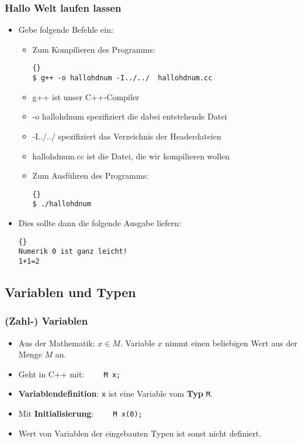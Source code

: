 \begin{frame}[fragile]
\frametitle{Hallo Welt laufen lassen}
\begin{itemize}
\item Gebe folgende Befehle ein:
\begin{itemize}
\item Zum Kompilieren des Programms:
{\footnotesize\begin{lstlisting}{}
$ g++ -o hallohdnum -I../../  hallohdnum.cc
\end{lstlisting}}
\item g++ ist unser C++-Compiler
\item -o hallohdnum spezifiziert die dabei entstehende Datei
\item -I../../ spezifiziert das Verzeichnis der Headerdateien
\item hallohdnum.cc ist die Datei, die wir kompilieren wollen
\item Zum Ausführen des Programms:
{\small\begin{lstlisting}{}
$ ./hallohdnum
\end{lstlisting}}
\end{itemize}
\item Dies sollte dann die folgende Ausgabe liefern:
{\small\begin{lstlisting}{}
Numerik 0 ist ganz leicht!
1+1=2
\end{lstlisting}}
\end{itemize}
\end{frame}


\subsection{Variablen und Typen}

\begin{frame}[fragile]
\frametitle{(Zahl-) Variablen}
\begin{itemize}
\item Aus der Mathematik: \glqq{}$x\in M$\grqq{}. Variable $x$ nimmt einen
  beliebigen Wert aus der Menge $M$ an.
\item Geht in C++ mit: \lstinline{    M x;}
\item \textbf{Variablendefinition}:
\lstinline{x} ist eine Variable vom \textbf{Typ} \lstinline{M}.
\item Mit \textbf{Initialisierung}: \lstinline{    M x(0);}
\item Wert von Variablen der \glqq{}eingebauten\grqq{} Typen ist sonst
  nicht definiert.
\end{itemize}

\end{frame}


